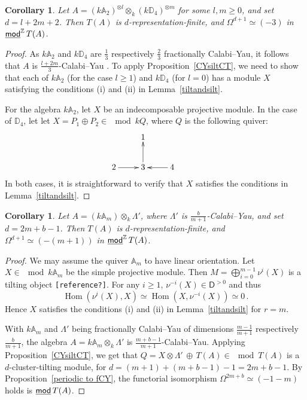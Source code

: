 \documentclass[a4paper,reqno,11pt]{amsart}
\newtheorem{corollary}[theorem]{Corollary}
\theoremstyle{definition}
\newcommand{\DDD}{\mathsf{D}}
\newcommand{\Z}{\mathbb{Z}}
\newcommand{\Hom}{\operatorname{Hom}\nolimits}
\newcommand{\stmod}{\mathop{\underline{\mod}}\nolimits}
\numberwithin{equation}{section}
\begin{document}
\begin{corollary}
  Let $A = (k\mathbb{A}_2)^{\otimes l} \otimes_k (k\mathbb{D}_4)^{\otimes m}$ for some $l,m\ge0$, and set $d=l+2m+2$. Then $T(A)$ is $d$-representation-finite, and $\Omega^{d+1} \simeq (-3)$ in $\stmod^\Z T(A)$.
\end{corollary}

\begin{proof}
  As $k\mathbb{A}_2$ and $k\mathbb{D}_4$ are $\frac{1}{3}$ respectively $\frac{2}{3}$ fractionally Calabi--Yau, it follows that $A$ is $\frac{l+2m}{3}$-Calabi--Yau \cite[Proposition~1.4]{HerIya}.
To apply Proposition~\ref{CYsiltCT}, we need to show that each of $k\mathbb{A}_2$ (for the case $l\ge1$) and $k\mathbb{D}_4$ (for $l=0$) has a module $X$ satisfying the conditions (i) and (ii) in Lemma~\ref{tiltandsilt}.

For the algebra $k\mathbb{A}_2$, let $X$ be an indecomposable projective module. 
%
In the case of $\mathbb{D}_4$, let let $X = P_1\oplus P_2\in \mod kQ$, where $Q$ is the following quiver:
\[ \xymatrix{ &1 & &\\ 2\ar[r] & 3\ar[u] & \ar[l]4} \]
%
In both cases, it is straightforward to verify that $X$ satisfies the conditions
in Lemma~\ref{tiltandsilt}.
\end{proof}


\begin{corollary}
  Let $A = (k\mathbb{A}_m) \otimes_k \Lambda'$, where $\Lambda'$ is $\frac{b}{m+1}$-Calabi--Yau, and set $d = 2m+b-1$. 
  Then $T(A)$ is $d$-representation-finite, and $\Omega^{d+1} \simeq (-(m+1))$ in $\stmod^\Z T(A)$.
\end{corollary}

\begin{proof}
  We may assume the quiver $\mathbb{A}_m$ to have linear orientation. Let $X\in\mod k\mathbb{A}_m$ be the simple projective module.
  Then $M = \bigoplus_{i=0}^{m-1} \nu^i(X)$ is a tilting object \texttt{[reference?]}.
  For any $i\ge1$, $\nu^{-i}(X)\in\DDD^{>0}$ and thus
  \[ \Hom(\nu^i(X),X)\simeq \Hom(X, \nu^{-i}(X))\simeq 0 \,.\]
  Hence $X$ satisfies the conditions (i) and (ii) in Lemma~\ref{tiltandsilt} for $r=m$.

  With $k\mathbb{A}_m$ and $\Lambda'$ being fractionally Calabi--Yau of dimensions $\frac{m-1}{m+1}$ respectively $\frac{b}{m+1}$, the algebra $A = k\mathbb{A}_m\otimes_k \Lambda'$ is $\frac{m+b-1}{m+1}$-Calabi--Yau.
  Applying Proposition~\ref{CYsiltCT}, we get that $Q=X\otimes\Lambda'\,\oplus\, T(A) \in\mod T(A)$ is a $d$-cluster-tilting module, for $d = (m+1) + (m+b-1) -1 = 2m+b-1$.
  By Proposition~\ref{periodic to fCY}, the functorial isomorphism $\Omega^{2m+b}\simeq (-1-m)$ holds is $\stmod T(A)$. 
\end{proof}
\end{document}
